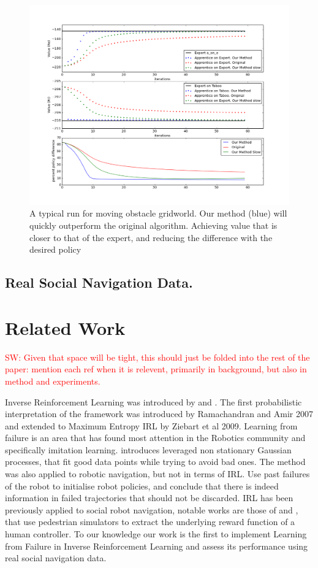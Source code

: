 \documentclass[letterpaper]{article}
\newcommand{\sw}[1]{\textcolor{red}{SW: #1}}
\newcommand{\sw}[1]{}
\begin{document}
\begin{figure}[t]
  \centering
  \includegraphics[width=0.9\columnwidth]{images/testgraph}
  \caption{A typical run for moving obstacle gridworld. Our method (blue) will quickly outperform the original algorithm. Achieving value that is closer to that of the expert, and reducing the difference with the desired policy\label{fig:results}}
\end{figure}

\subsection{Real Social Navigation Data.}




\section{Related Work}

\sw{Given that space will be tight, this should just be folded into the rest of the paper: mention each ref when it is relevent, primarily in background, but also in method and experiments.}

Inverse Reinforcement Learning was introduced by \cite{ng2000algorithms} and \cite{abbeel2004apprenticeship}. The first probabilistic interpretation of the framework was introduced by Ramachandran and Amir 2007 and extended to Maximum Entropy IRL by Ziebart et al 2009. 	Learning from failure is an area that has found most attention in the Robotics community and specifically imitation learning. \cite{choi2015} introduces leveraged non stationary Gaussian processes, that fit good data points while trying to avoid bad ones. The method was also applied to robotic navigation, but not in terms of IRL. \cite{grollman2012robot} Use past failures of the robot to initialise robot policies, and conclude that there is indeed information in failed trajectories that should not be discarded. IRL has been previously applied to social robot navigation, notable works are those of \cite{henry2010learning} and \cite{vasquez2014inverse}, that use pedestrian simulators to extract the underlying reward function of a human controller. To our knowledge our work is the first to implement Learning from Failure in Inverse Reinforcement Learning and assess its performance using real social navigation data.
\end{document}
